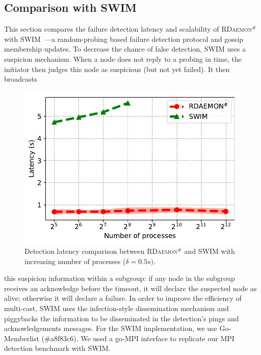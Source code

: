 \documentclass[sigconf]{acmart}
\newcommand{\mpi}[0]{\textsc{MPI}\xspace}
\newcommand{\ourwork}[0]{\textsc{RDaemon}\ensuremath{^\#}\xspace}
\begin{document}
\subsection{Comparison with SWIM}
This section compares the failure detection latency and scalability of \ourwork with SWIM~\cite{Abhinandan02}---a random-probing based failure detection protocol and gossip membership updates. To decrease
the chance of false detection, SWIM uses a suspicion mechanism. When a node does not reply to a probing in time, the initiator then judges this node as suspicious (but not yet failed). It then broadcasts
\begin{figure}[h]
  \centering
  \includegraphics[width=\linewidth]{Scale_prrte_swim.pdf}
  \caption{Detection latency comparison between \ourwork and SWIM with increasing number of processes ($\delta=0.5s).$}
  \label{fig:scale_swim}
\end{figure}
this suspicion information within a subgroup: if any node in the subgroup receives an acknowledge before the timeout, it will declare the suspected node as alive; otherwise it will declare a failure. In order to improve the efficiency of multi-cast, SWIM uses the infection-style dissemination mechanism and piggybacks the information to be disseminated in the detection's pings and acknowledgements messages.
For the SWIM implementation, we use Go-Memberlist (\#a8f83c6). We used a go-\mpi interface
to replicate our \mpi detection benchmark with SWIM.
\end{document}
